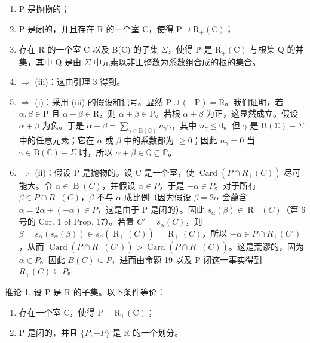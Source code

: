 \begin{enumerate}
\def\labelenumi{(\roman{enumi})}
\item
  P 是抛物的；
\item
  P 是闭的，并且存在 R 的一个室 C，使得 \(\mathrm{P} \supseteq \mathrm{R}_{+}(\mathrm{C})\)；
\item
  存在 R 的一个室 C 以及 B(C) 的子集 \(\Sigma\)，使得 P 是 \(\mathrm{R}_{+}(\mathrm{C})\) 与根集 Q 的并集，其中 Q 是由 \(\Sigma\) 中元素以非正整数为系数组合成的根的集合。
\item
  \(\Longrightarrow\) (iii)：这由引理 3 得到。
\item
  \(\Longrightarrow\) (i)：采用 (iii) 的假设和记号。显然 \(\mathrm{P} \cup (-\mathrm{P}) = \mathrm{R}\)。我们证明，若 \(\alpha, \beta \in \mathrm{P}\) 且 \(\alpha + \beta \in \mathrm{R}\)，则 \(\alpha + \beta \in \mathrm{P}\)。若根 \(\alpha + \beta\) 为正，这显然成立。假设 \(\alpha + \beta\) 为负。于是 \(\alpha + \beta = \sum_{\gamma \in \mathrm{B}(\mathbb{C})} n_{\gamma} \gamma\)，其中 \(n_{\gamma} \leqslant 0\)。但 \(\gamma\) 是 \(\mathrm{B}(\mathbb{C}) - \Sigma\) 中的任意元素；它在 \(\alpha\) 或 \(\beta\) 中的系数都为 \(\geqslant 0\)；因此 \(n_{\gamma} = 0\) 当 \(\gamma \in \mathrm{B}(\mathbb{C}) - \Sigma\) 时，所以 \(\alpha + \beta \in \mathbb{Q} \subseteq \mathbb{P}\)。
\item
  \(\Longrightarrow\) (ii)：假设 P 是抛物的。设 C 是一个室，使 \(\operatorname{Card}(P\cap R_{+}(C))\) 尽可能大。令 \(\alpha\in\operatorname{B}(C)\)，并假设 \(\alpha\in P\)，于是 \(-\alpha\in P\)。对于所有 \(\beta\in P\cap R_{+}(C)\)，\(\beta\) 不与 \(\alpha\) 成比例（因为假设 \(\beta=2\alpha\) 会蕴含 \(\alpha=2\alpha+(-\alpha)\in P\)，这是由于 P 是闭的）。因此 \(s_{\alpha}(\beta)\in\operatorname{R}_{+}(C)\)（第 6 号的 Cor. 1 of Prop. 17）。若置 \(C'=s_{\alpha}(C)\)，则 \(\beta=s_{\alpha}(s_{\alpha}(\beta))\in s_{\alpha}(\operatorname{R}_{+}(C))=\operatorname{R}_{+}(C)\)，所以 \(-\alpha\in P\cap R_{+}(C')\)，从而 \(\operatorname{Card}(P\cap R_{+}(C'))>\operatorname{Card}(P\cap R_{+}(C))\)。这是荒谬的，因为 \(\alpha\in P\)。因此 \(B(C)\subseteq P\)，进而由命题 19 以及 P 闭这一事实得到 \(R_{+}(C)\subseteq P\)。
\end{enumerate}

推论 1. 设 P 是 R 的子集。以下条件等价：

\begin{enumerate}
\def\labelenumi{(\roman{enumi})}
\item
  存在一个室 C，使得 \(\mathrm{P} = \mathrm{R}_{+}(\mathrm{C})\)；
\item
  P 是闭的，并且 \(\{P, -P\}\) 是 R 的一个划分。
\end{enumerate}

